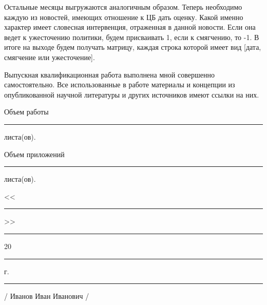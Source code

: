 \documentclass[12pt, a4paper, oneside]{extreport}
\begin{document}
Остальные месяцы выгружаются аналогичным образом. Теперь необходимо каждую из новостей, имеющих отношение к ЦБ дать оценку. Какой именно характер имеет словесная интервенция, отраженная в данной новости. Если она ведет к ужесточению политики, будем присваивать 1, если к смягчению, то -1. В итоге на выходе будем получать матрицу, каждая строка которой имеет вид [дата, смягчение или ужесточение].


\newpage
\thispagestyle{empty}

Выпускная квалификационная работа выполнена мной совершенно самостоятельно. Все использованные в работе материалы и концепции из опубликованной научной литературы и других источников имеют ссылки на них.

\vspace{2ex}

Объем работы  \rule{2em}{0.5pt} листа(ов).

\vspace{2ex}

Объем приложений \rule{2em}{0.5pt} листа(ов).

\vspace{4ex}

\noindent << \rule{1em}{0.5pt} >> \rule{5em}{0.5pt} 20 \rule{1.4em}{0.5pt} г. 

\vspace{4ex}

\noindent \rule{11em}{0.5pt} \hspace{8em} / Иванов Иван Иванович /
\end{document}

